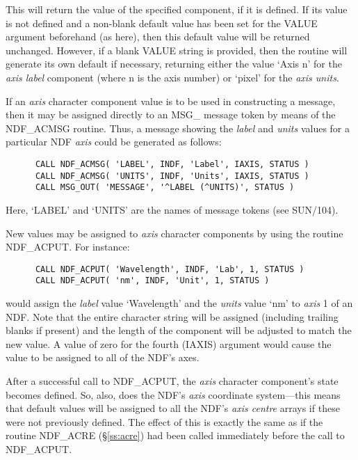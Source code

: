 \documentclass[twoside,11pt]{article}
\newcommand{\htmlref}[2]{#1}
\newcommand{\xref}[3]{#1}
\newcommand{\st}[1]{{\em{#1}}}
\begin{document}
This will return the value of the specified component, if it is defined.
If its value is not defined and a non-blank default value has been set for
the VALUE argument beforehand (as here), then this default value will be
returned unchanged. 
However, if a blank VALUE string is provided, then the routine will generate
its own default if necessary, returning either the value `Axis n' for the
\st{axis label\/} component (where n is the axis number) or `pixel' for the
\st{axis units}.

If an \st{axis\/} character component value is to be used in
constructing a message, then it may be assigned directly to an
\xref{MSG\_ message token}{sun104}{msg} by means of the \htmlref{NDF\_ACMSG}{NDF_ACMSG}
routine.
Thus, a message showing the \st{label\/} and \st{units\/} values for a
particular NDF \st{axis\/} could be generated as follows: 

\small
\begin{verbatim}
      CALL NDF_ACMSG( 'LABEL', INDF, 'Label', IAXIS, STATUS )
      CALL NDF_ACMSG( 'UNITS', INDF, 'Units', IAXIS, STATUS )
      CALL MSG_OUT( 'MESSAGE', '^LABEL (^UNITS)', STATUS )
\end{verbatim}
\normalsize

Here, `LABEL' and `UNITS' are the names of message tokens (see
\xref{SUN/104}{sun104}{}).

New values may be assigned to \st{axis\/} character components by using the
routine \htmlref{NDF\_ACPUT}{NDF_ACPUT}. 
For instance:

\small
\begin{verbatim}
      CALL NDF_ACPUT( 'Wavelength', INDF, 'Lab', 1, STATUS )
      CALL NDF_ACPUT( 'nm', INDF, 'Unit', 1, STATUS )
\end{verbatim}
\normalsize

would assign the \st{label\/} value `Wavelength' and the \st{units\/} value 
`nm' to \st{axis\/} 1 of an NDF.
Note that the entire character string will be assigned (including trailing
blanks if present) and the length of the component will be adjusted to match
the new value. 
A value of zero for the fourth (IAXIS) argument would cause the value to be
assigned to all of the NDF's axes. 

After a successful call to NDF\_ACPUT, the \st{axis\/} character
component's state becomes defined. 
So, also, does the NDF's \st{axis\/} coordinate system---this means that
default values will be assigned to all the NDF's \st{axis centre\/} arrays
if these were not previously defined. 
The effect of this is exactly the same as if the routine \htmlref{NDF\_ACRE}{NDF_ACRE}
(\S\ref{ss:acre}) had been called immediately before the call to NDF\_ACPUT. 
\end{document}
